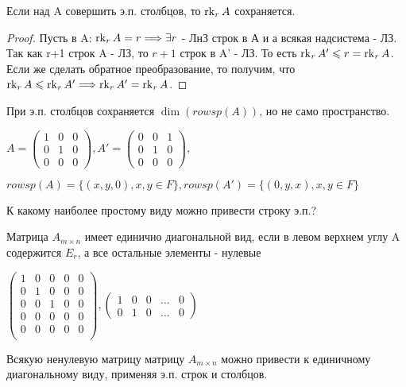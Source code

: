 \begin{corollary}
	Если над A совершить э.п. столбцов, то \(\operatorname{rk}_rA\) сохраняется.
\end{corollary}
\begin{proof}
	Пусть в A: \(\operatorname{rk}_rA =r\Longrightarrow \exists r\) - ЛнЗ строк в А и а всякая надсистема - ЛЗ. Так как r+1 строк A - ЛЗ, то \(r+1\) строк в A' - ЛЗ. То есть \(\operatorname{rk}_r A'\leqslant r = \operatorname{rk}_r A\). Если же сделать обратное преобразование, то получим, что \(\operatorname{rk}_r A\leqslant \operatorname{rk}_r A'\Longrightarrow \operatorname{rk}_r A' = \operatorname{rk}_r A\). 
\end{proof}
\begin{note}
	При э.п. столбцов сохраняется \(\dim(rowsp(A))\), но не само пространство. 
	
	\(A = \begin{pmatrix}
		1 & 0 & 0 \\
		0 & 1 & 0 \\ 
		0 & 0 & 0
	\end{pmatrix}, A' = \begin{pmatrix}
	0 & 0 & 1 \\
	0 & 1 & 0 \\
	0 & 0 & 0
	\end{pmatrix},\)  
	
	\( rowsp(A) = \{(x,y,0), x,y\in F\}, rowsp(A')=\{(0,y,x),x,y\in F\}\)
\end{note}
\begin{note}
	К какому наиболее простому виду можно привести строку э.п.?
\end{note}
\begin{definition}
	Матрица \(A_{m\times n}\) имеет единично диагональной вид, если в левом верхнем углу A содержится \(E_r\), а все остальные элементы - нулевые
\end{definition}
\begin{example}
	$\begin{pmatrix}
		1 & 0 & 0 & 0 & 0 \\
		0 & 1 & 0 & 0 & 0 \\
		0 & 0 & 1 & 0 & 0 \\
		0 & 0 & 0 & 0 & 0 \\
		0 & 0 & 0 & 0 & 0 \\
	\end{pmatrix}, \begin{pmatrix}
	1 & 0 & 0 & \ldots & 0 \\
	0 & 1 & 0 & \ldots & 0
	\end{pmatrix}$
\end{example}
\begin{proposition}
	Всякую ненулевую матрицу матрицу \(A_{m\times n}\) можно привести к единичному диагональному виду, применяя э.п. строк и столбцов.
\end{proposition}
